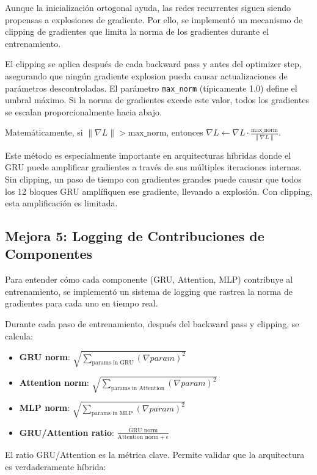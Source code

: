 Aunque la inicialización ortogonal ayuda, las redes recurrentes siguen siendo propensas a explosiones de gradiente. Por ello, se implementó un mecanismo de clipping de gradientes que limita la norma de los gradientes durante el entrenamiento.

El clipping se aplica después de cada backward pass y antes del optimizer step, asegurando que ningún gradiente explosion pueda causar actualizaciones de parámetros descontroladas. El parámetro \texttt{max\_norm} (típicamente 1.0) define el umbral máximo. Si la norma de gradientes excede este valor, todos los gradientes se escalan proporcionalmente hacia abajo.

Matemáticamente, si $\|\nabla L\| > \text{max\_norm}$, entonces $\nabla L \leftarrow \nabla L \cdot \frac{\text{max\_norm}}{\|\nabla L\|}$.

Este método es especialmente importante en arquitecturas híbridas donde el GRU puede amplificar gradientes a través de sus múltiples iteraciones internas. Sin clipping, un paso de tiempo con gradientes grandes puede causar que todos los 12 bloques GRU amplífiquen ese gradiente, llevando a explosión. Con clipping, esta amplificación es limitada.

\subsection{Mejora 5: Logging de Contribuciones de Componentes}

Para entender cómo cada componente (GRU, Attention, MLP) contribuye al entrenamiento, se implementó un sistema de logging que rastrea la norma de gradientes para cada uno en tiempo real.

Durante cada paso de entrenamiento, después del backward pass y clipping, se calcula:

\begin{itemize}
    \item \textbf{GRU norm}: $\sqrt{\sum_{\text{params in GRU}} (\nabla param)^2}$
    \item \textbf{Attention norm}: $\sqrt{\sum_{\text{params in Attention}} (\nabla param)^2}$
    \item \textbf{MLP norm}: $\sqrt{\sum_{\text{params in MLP}} (\nabla param)^2}$
    \item \textbf{GRU/Attention ratio}: $\frac{\text{GRU norm}}{\text{Attention norm} + \epsilon}$
\end{itemize}

El ratio GRU/Attention es la métrica clave. Permite validar que la arquitectura es verdaderamente híbrida:

